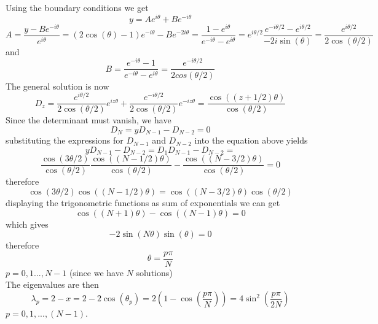 \documentclass[12pt]{report}
\begin{document}
 Using the boundary conditions we get 
 \begin{equation*}
 y = Ae^{i\theta}+Be^{-i\theta}
 \end{equation*}
 \begin{equation*}
 A=\frac{y-Be^{-i\theta}}{e^{i\theta}}=(2\cos(\theta)-1)e^{-i\theta}-Be^{-2i\theta} =\frac{1-e^{i\theta}}{e^{-i\theta}-e^{i\theta}}=e^{i\theta/2}\frac{e^{-i\theta/2}-e^{i\theta/2}}{-2i\sin(\theta)}=\frac{e^{i\theta/2}}{2\cos(\theta/2)}
 \end{equation*}
 and 
 \begin{equation*}
 B=\frac{e^{-i\theta}-1}{e^{-i\theta}-e^{i\theta}}=\frac{e^{-i\theta/2}}{2cos(\theta/2)}
 \end{equation*}
The general solution is now
\begin{equation}
D_z=\frac{e^{i\theta/2}}{2\cos(\theta/2)}e^{iz\theta}+\frac{e^{-i\theta/2}}{2\cos(\theta/2)}e^{-iz\theta}=\frac{\cos((z+1/2)\theta)}{\cos(\theta/2)}
\end{equation}
Since the determinant must vanish, we have 
\begin{equation*}
D_N = yD_{N-1}-D_{N-2}=0
\end{equation*}
substituting the expressions for $D_{N-1}$ and $D_{N-2}$ into the equation above yields 
\begin{equation*}
yD_{N-1}-D_{N-2} = D_1D_{N-1}-D_{N-2} = 
\end{equation*}
\begin{equation*}
\frac{\cos(3\theta/2)}{\cos(\theta/2)}\frac{\cos((N-1/2)\theta)}{\cos(\theta/2)}-\frac{\cos((N-3/2)\theta)}{\cos(\theta/2)}=0
\end{equation*}
therefore 
\begin{equation*}
\cos(3\theta/2)\cos((N-1/2)\theta)=\cos((N-3/2)\theta)\cos(\theta/2)
\end{equation*}
displaying the trigonometric functions as sum of exponentials we can get
\begin{equation*}
\cos((N+1)\theta)-\cos((N-1)\theta)=0
\end{equation*}
which gives 
\begin{equation*}
-2\sin(N\theta)\sin(\theta)=0
\end{equation*}
therefore 
\begin{equation*}
\theta = \frac{p\pi}{N}
\end{equation*}
$p=0,1...,N-1$ (since we have $N$ solutions)\\

The eigenvalues are then
\begin{equation*}
\lambda_p=2-x = 2-2\cos(\theta_p)=2\left(1-\cos(\frac{p\pi}{N})\right)=4\sin^2(\frac{p\pi}{2N})
\end{equation*}
$p=0,1,...,(N-1)$.
\end{document}
